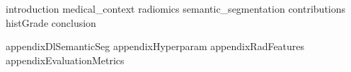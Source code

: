 \documentclass[]{memoir}
\begin{document}








\setlength\beforechapskip{-\baselineskip}

{
\tableofcontents
}

\newpage
%
\printacronyms[include-classes=abbrev,name=Abbreviations]
\newpage


{introduction}
{medical_context}
{radiomics}
{semantic_segmentation}
{contributions}
{histGrade}
{conclusion}

\begin{appendices}
{appendixDlSemanticSeg}
{appendixHyperparam}
{appendixRadFeatures}
{appendixEvaluationMetrics}
\end{appendices}

\newpage
%
\printbibliography[heading=bibintoc]
	

	
\end{document}
